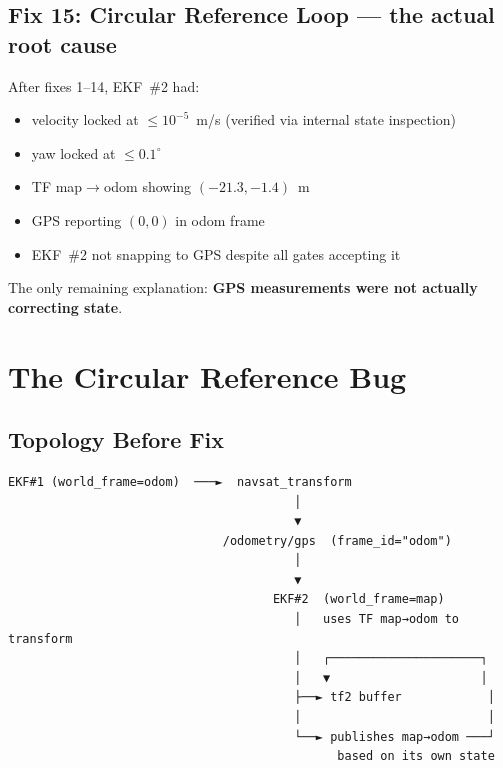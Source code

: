 \documentclass[11pt,a4paper]{article}
\begin{document}
\subsection{Fix 15: Circular Reference Loop --- the actual root cause}

After fixes 1--14, EKF~\#2 had:
\begin{itemize}[noitemsep]
\item velocity locked at $\le\!10^{-5}$~m/s (verified via internal state inspection)
\item yaw locked at $\le\!0.1^\circ$
\item TF map$\to$odom showing $(-21.3, -1.4)$~m
\item GPS reporting $(0, 0)$ in odom frame
\item EKF~\#2 not snapping to GPS despite all gates accepting it
\end{itemize}

\noindent
The only remaining explanation: \textbf{GPS measurements were not actually correcting state}.

\section{The Circular Reference Bug}

\subsection{Topology Before Fix}

\begin{tcolorbox}[colback=red!5,colframe=red!50,title=Broken topology]
\small
\begin{verbatim}
EKF#1 (world_frame=odom)  ───►  navsat_transform
                                        │
                                        ▼
                              /odometry/gps  (frame_id="odom")
                                        │
                                        ▼
                                     EKF#2  (world_frame=map)
                                        │   uses TF map→odom to transform
                                        │   ┌─────────────────────┐
                                        │   ▼                     │
                                        ├──► tf2 buffer            │
                                        │                          │
                                        └──► publishes map→odom ───┘
                                              based on its own state
\end{verbatim}
\end{tcolorbox}
\end{document}

